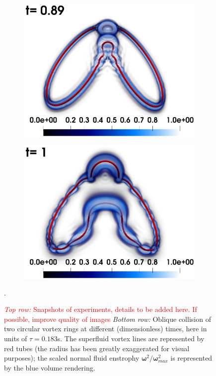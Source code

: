 \documentclass[%
 reprint,
 amsmath,amssymb,
 aps,
 prl,
]{revtex4-2}
\newcommand{\bom}{\boldsymbol{\omega}}
\def\red#1{\textcolor{red}{#1}}
\begin{document}
\begin{figure}[t]
\begin{subfigure}[b]{0.24\textwidth}
		\includegraphics*[width=\textwidth]{snap-3.png}
	\end{subfigure}
    \begin{subfigure}[b]{0.24\textwidth}
		\centering
		\includegraphics*[width=\textwidth]{snap-4.png}
	\end{subfigure}
\caption{\red{\emph{Top row:} Snapshots of experiments, details to be added here. If possible, improve quality of images}
\emph{Bottom row:} Oblique collision of two circular vortex rings at different 
(dimensionless) times, here in units of $\tau=0.183$s.
The superfluid vortex lines are represented by red tubes (the radius has been greatly 
exaggerated for visual purposes); the scaled normal fluid enstrophy 
$\bom^2/\bom^2_{max}$ is represented by the blue volume rendering.}. 
\label{fig:ring-coll-viz}
\end{figure}
\end{document}
